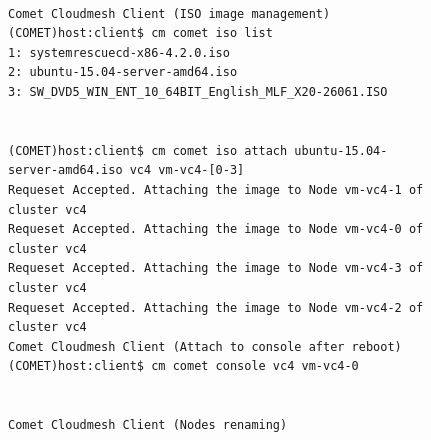 \begin{figure}[htb] 
\begin{small}
\begin{verbatim}

Comet Cloudmesh Client (ISO image management)
(COMET)host:client$ cm comet iso list
1: systemrescuecd-x86-4.2.0.iso
2: ubuntu-15.04-server-amd64.iso
3: SW_DVD5_WIN_ENT_10_64BIT_English_MLF_X20-26061.ISO


(COMET)host:client$ cm comet iso attach ubuntu-15.04-server-amd64.iso vc4 vm-vc4-[0-3]
Requeset Accepted. Attaching the image to Node vm-vc4-1 of cluster vc4
Requeset Accepted. Attaching the image to Node vm-vc4-0 of cluster vc4
Requeset Accepted. Attaching the image to Node vm-vc4-3 of cluster vc4
Requeset Accepted. Attaching the image to Node vm-vc4-2 of cluster vc4
Comet Cloudmesh Client (Attach to console after reboot)
(COMET)host:client$ cm comet console vc4 vm-vc4-0


Comet Cloudmesh Client (Nodes renaming)
\end{verbatim}
\end{small}
\end{figure}

